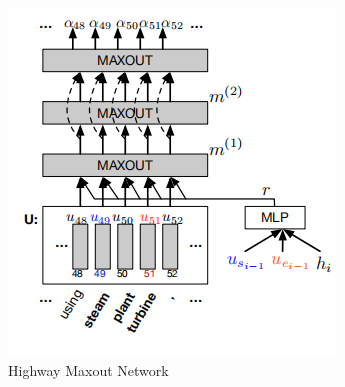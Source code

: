\documentclass[a4paper,UTF8]{article}
\numberwithin{equation}{section}
\begin{document}
\begin{enumerate}
\begin{figure}[H]
		\centering
		\includegraphics[]{2-5.png}
		\caption{Highway Maxout Network}
	\end{figure}
\end{enumerate}



\newpage
\end{document}
